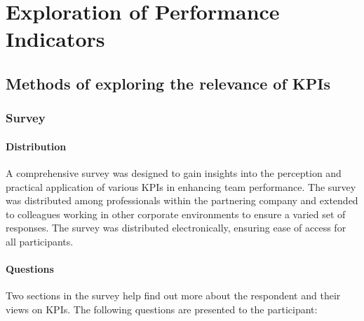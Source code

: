 \chapter{Exploration of Performance Indicators} 

\label{Chapter4} 

\section{Methods of exploring the relevance of KPIs}

\subsection{Survey}

\subsubsection{Distribution}

A comprehensive survey was designed to gain insights 
into the perception and practical application of various KPIs in 
enhancing team performance. 
The survey was distributed among professionals within the partnering 
company and extended to colleagues working in other corporate 
environments to ensure a varied set of responses.
The survey was distributed electronically, ensuring 
ease of access for all participants. 

\subsubsection{Questions}

Two sections in the survey help find out more about the respondent and their views on KPIs. 
The following questions are presented to the participant:

